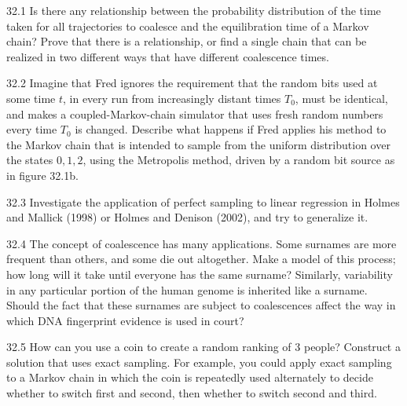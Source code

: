 \documentclass[12pt, a4paper]{article}
\begin{document}
\begin{prob}{32.1}
Is there any relationship between the probability distribution of the time taken for all trajectories to coalesce and the equilibration time of a Markov chain? Prove that there is a relationship, or find a single chain that can be realized in two different ways that have different coalescence times.
\end{prob}
\begin{sol}
\end{sol}
\bigskip

\begin{prob}{32.2}
Imagine that Fred ignores the requirement that the random bits used at some time $t$, in every run from increasingly distant times $T_0$, must be identical, and makes a coupled-Markov-chain simulator that uses fresh random numbers every time $T_0$ is changed. Describe what happens if Fred applies his method to the Markov chain that is intended to sample from the uniform distribution over the states $0,1,2$, using the Metropolis method, driven by a random bit source as in figure 32.1b.
\end{prob}
\begin{sol}
\end{sol}
\bigskip

\begin{prob}{32.3}
Investigate the application of perfect sampling to linear regression in Holmes and Mallick (1998) or Holmes and Denison (2002), and try to generalize it.
\end{prob}
\begin{sol}
\end{sol}
\bigskip

\begin{prob}{32.4}
The concept of coalescence has many applications. Some surnames are more frequent than others, and some die out altogether. Make a model of this process; how long will it take until everyone has the same surname? Similarly, variability in any particular portion of the human genome is inherited like a surname. Should the fact that these surnames are subject to coalescences affect the way in which DNA fingerprint evidence is used in court?
\end{prob}
\begin{sol}
\end{sol}
\bigskip

\begin{prob}{32.5}
How can you use a coin to create a random ranking of 3 people? Construct a solution that uses exact sampling. For example, you could apply exact sampling to a Markov chain in which the coin is repeatedly used alternately to decide whether to switch first and second, then whether to switch second and third.
\end{prob}
\begin{sol}
\end{sol}
\bigskip
\end{document}

